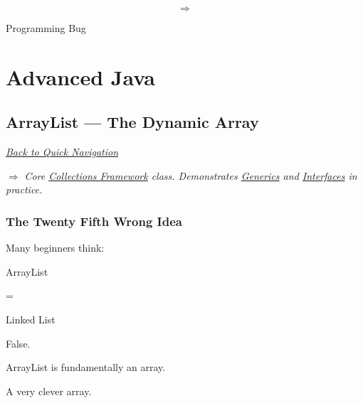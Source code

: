 \documentclass[11pt,a4paper]{book}
\begin{document}
\[
\Rightarrow
\]

Programming Bug


\part{Advanced Java}
\chapter{ArrayList --- The Dynamic Array}

\smallskip
\noindent
\hyperref[sec:quick_nav]{\emph{Back to Quick Navigation}}

\smallskip
\noindent
\textcolor{RosettaRoyalPurple}{$\Rightarrow$}
\emph{Core \hyperref[chap:collections]{Collections Framework} class. Demonstrates \hyperref[chap:generics]{Generics} and \hyperref[chap:interfaces]{Interfaces} in practice.}


\section{The Twenty Fifth Wrong Idea}

\begin{trap}

Many beginners think:


ArrayList

=

Linked List


False.


ArrayList is fundamentally
an array.


A very clever array.

\end{trap}

\end{document}
